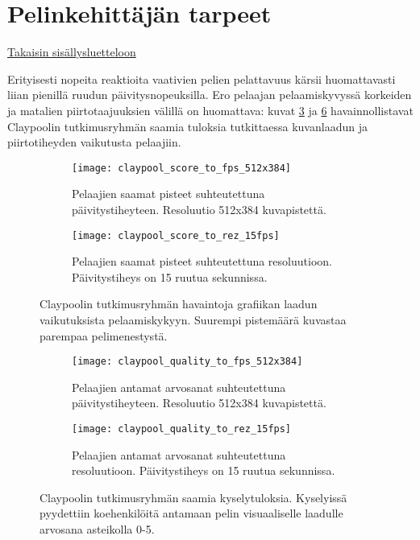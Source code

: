 \section{Pelinkehittäjän tarpeet}
\label{sec:tarpeet}
\hyperlink{index}{Takaisin sisällysluetteloon}

Erityisesti nopeita reaktioita vaativien pelien pelattavuus kärsii huomattavasti liian pienillä ruudun päivitysnopeuksilla. Ero pelaajan pelaamiskyvyssä korkeiden ja matalien piirtotaajuuksien välillä on huomattava: kuvat \ref{fig:claypool_performance} ja \ref{fig:claypool_quality} havainnollistavat Claypoolin tutkimusryhmän\cite{claypool_fps} saamia tuloksia tutkittaessa kuvanlaadun ja piirtotiheyden vaikutusta pelaajiin. 

\begin{figure}[h]
    \begin{subfigure}{0.49\textwidth}
        \texttt{[image: claypool\_score\_to\_fps\_512x384]}
        \caption{\label{fig:claypool_performance:fps}Pelaajien saamat pisteet suhteutettuna päivitystiheyteen. Resoluutio 512x384 kuvapistettä.}
    \end{subfigure}
    \begin{subfigure}{0.49\textwidth}
        \texttt{[image: claypool\_score\_to\_rez\_15fps]}
        \caption{Pelaajien saamat pisteet suhteutettuna resoluutioon. Päivitystiheys on 15 ruutua sekunnissa.\label{fig:claypool_performance:rez}}
    \end{subfigure}
    \caption{\label{fig:claypool_performance}Claypoolin tutkimusryhmän\cite{claypool_fps} havaintoja grafiikan laadun vaikutuksista pelaamiskykyyn. Suurempi pistemäärä kuvastaa parempaa pelimenestystä.}
\end{figure}
\begin{figure}[h]
    \begin{subfigure}{0.49\textwidth}
        \texttt{[image: claypool\_quality\_to\_fps\_512x384]}
        \caption{\label{fig:claypool_quality:fps}Pelaajien antamat arvosanat suhteutettuna päivitystiheyteen. Resoluutio 512x384 kuvapistettä.}
    \end{subfigure}
    \begin{subfigure}{0.49\textwidth}
        \texttt{[image: claypool\_quality\_to\_rez\_15fps]}
        \caption{\label{fig:claypool_quality:rez}Pelaajien antamat arvosanat suhteutettuna resoluutioon. Päivitystiheys on 15 ruutua sekunnissa.}
    \end{subfigure}
    \caption{\label{fig:claypool_quality}Claypoolin tutkimusryhmän\cite{claypool_fps} saamia kyselytuloksia. Kyselyissä pyydettiin koehenkilöitä antamaan pelin visuaaliselle laadulle arvosana asteikolla 0-5.}
\end{figure}


